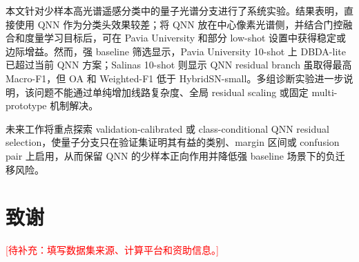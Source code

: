 \documentclass[UTF8,a4paper,zihao=-4,fontset=fandol]{ctexart}
\newcommand{\todo}[1]{\textcolor{red}{[待补充：#1]}}
\begin{document}
本文针对少样本高光谱遥感分类中的量子光谱分支进行了系统实验。结果表明，直接使用 QNN 作为分类头效果较差；将 QNN 放在中心像素光谱侧，并结合门控融合和度量学习目标后，可在 Pavia University 和部分 low-shot 设置中获得稳定或边际增益。然而，强 baseline 筛选显示，Pavia University 10-shot 上 DBDA-lite 已超过当前 QNN 方案；Salinas 10-shot 则显示 QNN residual branch 虽取得最高 Macro-F1，但 OA 和 Weighted-F1 低于 HybridSN-small。多组诊断实验进一步说明，该问题不能通过单纯增加线路复杂度、全局 residual scaling 或固定 multi-prototype 机制解决。

未来工作将重点探索 validation-calibrated 或 class-conditional QNN residual selection，使量子分支只在验证集证明其有益的类别、margin 区间或 confusion pair 上启用，从而保留 QNN 的少样本正向作用并降低强 baseline 场景下的负迁移风险。

\section*{致谢}

\todo{填写数据集来源、计算平台和资助信息。}
\end{document}
